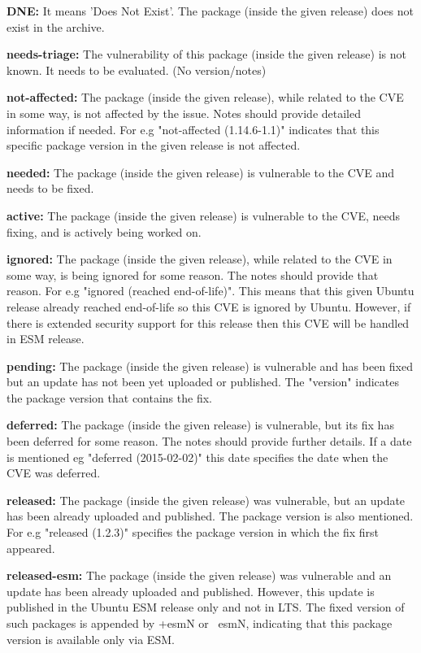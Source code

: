 \documentclass[a4paper,num-refs]{oup-contemporary}
\begin{document}
\textbf{DNE:} It means 'Does Not Exist'. The package (inside the given release) does not exist in the
		archive.

\textbf{needs-triage:} The vulnerability of this package (inside the given release)
		is not known. It needs to be evaluated.  (No version/notes)

\textbf{not-affected:} The package (inside the given release), while related to the
		CVE in some way, is not affected by the issue. Notes should
		provide detailed information if needed. For e.g
		"not-affected (1.14.6-1.1)" indicates that this specific
		package version in the given release is not affected.

\textbf{needed:} The package (inside the given release) is vulnerable to the
		CVE and needs to be fixed.

\textbf{active:} The package (inside the given release) is vulnerable to the
		CVE, needs fixing, and is actively being worked on.

\textbf{ignored:} The package (inside the given release), while related to the
		CVE in some way, is being ignored for some reason.  The
		notes should provide that reason. For e.g "ignored (reached end-of-life)".
		This means that this given Ubuntu release already reached
		end-of-life so this CVE is ignored by Ubuntu. However, if there
		is extended security support for this release then this
		CVE will be handled in ESM release.

\textbf{pending:} The package (inside the given release) is vulnerable and
                  has been fixed but an update has not been yet uploaded or
		  published. The "version" indicates the package version 
		  that contains the fix.

\textbf{deferred:} The package (inside the given release) is vulnerable, but 
                   its fix has been deferred for some reason. The notes
		   should provide further details. If a date is mentioned eg
		   "deferred (2015-02-02)" this date specifies the date when
		   the CVE was deferred.

\textbf{released:} The package (inside the given release) was vulnerable, but
		an update has been already uploaded and published. The package version
		is also mentioned. For e.g "released (1.2.3)"
		specifies the package version in which the fix first appeared.

\textbf{released-esm:} The package (inside the given release) was vulnerable and
		an update has been already uploaded and published. However,
		this update is published in the Ubuntu ESM release only and not in LTS.
		The fixed version of such packages is appended by
		+esmN or ~esmN, indicating that this package version is available
		only via ESM.
\end{document}
